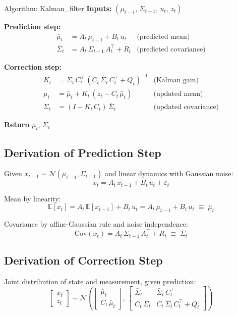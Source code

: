 \documentclass[11pt,a4paper]{article}
\begin{document}
\begin{algobox}{Algorithm: Kalman\_filter}
\textbf{Inputs:} $(\mu_{t-1},\, \Sigma_{t-1},\, u_t,\, z_t)$


\textbf{Prediction step:}
\begin{align*}
\bar{\mu}_t &= A_t\, \mu_{t-1} + B_t\, u_t & \text{(predicted mean)} \\
\bar{\Sigma}_t &= A_t\, \Sigma_{t-1}\, A_t^\top + R_t & \text{(predicted covariance)}
\end{align*}

\textbf{Correction step:}
\begin{align*}
K_t &= \bar{\Sigma}_t\, C_t^\top\, (C_t\, \bar{\Sigma}_t\, C_t^\top + Q_t)^{-1} & \text{(Kalman gain)} \\
\mu_t &= \bar{\mu}_t + K_t\, (z_t - C_t\, \bar{\mu}_t) & \text{(updated mean)} \\
\Sigma_t &= (I - K_t\, C_t)\, \bar{\Sigma}_t & \text{(updated covariance)}
\end{align*}

\textbf{Return} $\mu_t,\, \Sigma_t$
\end{algobox}

\subsection{Derivation of Prediction Step}

Given $x_{t-1} \sim \mathcal{N}(\mu_{t-1}, \Sigma_{t-1})$ and linear dynamics with Gaussian noise:
\[
x_t = A_t\, x_{t-1} + B_t\, u_t + \varepsilon_t
\]

Mean by linearity:
\[
\mathbb{E}[x_t] = A_t\, \mathbb{E}[x_{t-1}] + B_t\, u_t = A_t\, \mu_{t-1} + B_t\, u_t \;\equiv\; \bar{\mu}_t
\]

Covariance by affine-Gaussian rule and noise independence:
\[
\mathrm{Cov}(x_t) = A_t\, \Sigma_{t-1}\, A_t^\top + R_t \;\equiv\; \bar{\Sigma}_t
\]

\subsection{Derivation of Correction Step}

Joint distribution of state and measurement, given prediction:
\[
\begin{bmatrix}x_t \\ z_t\end{bmatrix} \sim \mathcal{N}\!\left(\begin{bmatrix}\bar{\mu}_t \\ C_t\, \bar{\mu}_t\end{bmatrix},\, \begin{bmatrix}\bar{\Sigma}_t & \bar{\Sigma}_t\, C_t^\top \\ C_t\, \bar{\Sigma}_t & C_t\, \bar{\Sigma}_t\, C_t^\top + Q_t\end{bmatrix}\right)
\]
\end{document}
